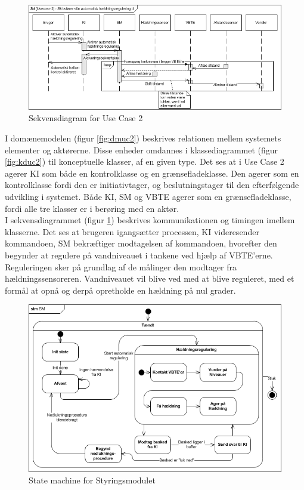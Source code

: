 \begin{figure}[H]
\centering
\includegraphics[scale=0.8]{billeder/Systemarkitektur/SD_UC2}
\caption{Sekvensdiagram for Use Case 2}
\label{fig:sduc2}
\end{figure}

I domænemodelen (figur \ref{fig:dmuc2}) beskrives relationen mellem systemets elementer og aktørerne. Disse enheder omdannes i klassediagrammet (figur \ref{fig:kduc2}) til konceptuelle klasser, af en given type. Det ses at i Use Case 2 agerer KI som både en kontrolklasse og en grænsefladeklasse. Den agerer som en kontrolklasse fordi den er initiativtager, og beslutningstager til den efterfølgende udvikling i systemet. Både KI, SM og VBTE agerer som en grænsefladeklasse, fordi alle tre klasser er i berøring med en aktør.\\
I sekvensdiagrammet (figur \ref{fig:sduc2}) beskrives kommunikationen og timingen imellem klasserne. Det ses at brugeren igangsætter processen, KI videresender kommandoen, SM bekræftiger modtagelsen af kommandoen, hvorefter den begynder at regulere på vandniveauet i tankene ved hjælp af VBTE'erne. Reguleringen sker på grundlag af de målinger den modtager fra hældningssensoreren. Vandniveauet vil blive ved med at blive reguleret, med et formål at opnå og derpå opretholde en hældning på nul grader.

\begin{figure}[htbp]
\centering
\includegraphics[scale=0.8]{billeder/Systemarkitektur/stm_sm}
\caption{State machine for Styringsmodulet}
\label{fig:stm_sm}
\end{figure}

